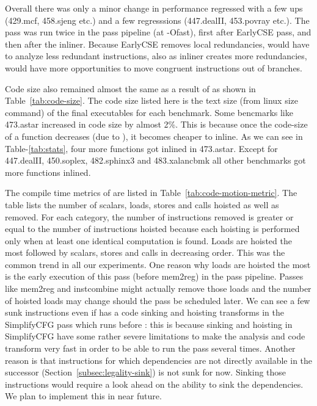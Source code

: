 \documentclass[acmlarge,review,anonymous]{acmart}\settopmatter{printfolios=true}
\begin{document}
Overall there was only a minor change in performance regressed with a few ups
(429.mcf, 458.sjeng etc.) and a few regresssions (447.dealII, 453.povray
etc.). The \gcm{} pass was run twice in the pass pipeline (at -Ofast),
first after EarlyCSE pass, and then after the inliner. Because EarlyCSE removes
local redundancies, \GCM{} would have to analyze less redundant instructions, also
as inliner creates more redundancies, \GCM{} would have more opportunities to move
congruent instructions out of branches.

Code size also remained almost the same as a result of \gcm{} as shown in
Table~\ref{tab:code-size}.  The code size listed here is the text size (from
linux size command) of the final executables for each benchmark.  Some bencmarks
like 473.astar increased in code size by almost 2\%. This is because once the
code-size of a function decreases (due to \GCM{}), it becomes cheaper to inline. As
we can see in Table-\ref{tab:stats}, four more functions got inlined in
473.astar. Except for 447.dealII, 450.soplex, 482.sphinx3 and 483.xalancbmk all
other benchmarks got more functions inlined.

The compile time metrics of \GCM{} are listed in
Table~\ref{tab:code-motion-metric}. The table lists the number of scalars,
loads, stores and calls hoisted as well as removed. For each category, the
number of instructions removed is greater or equal to the number of instructions
hoisted because each hoisting is performed only when at least one identical
computation is found. Loads are hoisted the most followed by scalars, stores and
calls in decreasing order.  This was the common trend in all our
experiments. One reason why loads are hoisted the most is the early execution of
this pass (before mem2reg) in the \LLVM{} pass pipeline. Passes like mem2reg and
instcombine might actually remove those loads and the number of hoisted loads
may change should the \GCM{} pass be scheduled later. We can see a few sunk
instructions even if \LLVM{} has a code sinking and hoisting transforms in the
SimplifyCFG pass which runs before \GCM{}: this is because sinking and hoisting
in SimplifyCFG have some rather severe limitations to make the analysis and code
transform very fast in order to be able to run the pass several times.  Another
reason is that instructions for which dependencies are not directly available in
the successor (Section~\ref{subsec:legality-sink}) is not sunk for now. Sinking
those instructions would require a look ahead on the ability to sink the
dependencies. We plan to implement this in near future.
\end{document}

